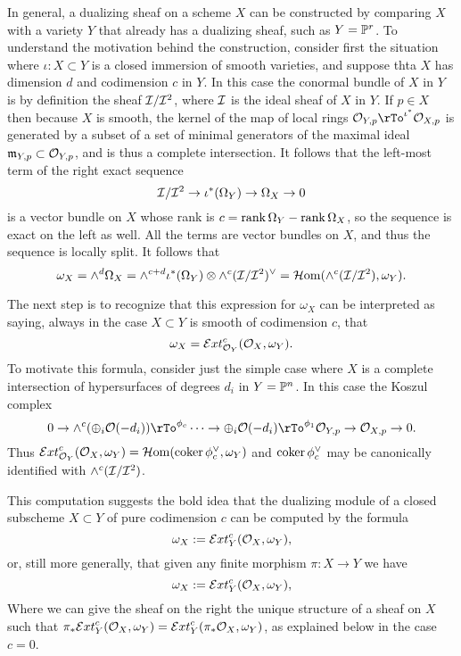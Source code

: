 In general, a dualizing sheaf on a scheme $X$ can be constructed by comparing $X$ with a 
variety $Y$ that already has a dualizing sheaf, such as $Y=\PP^{r}$. To understand the motivation behind the construction, 
consider first the situation where $\iota: X\subset Y$ is a closed immersion of smooth varieties, and suppose thta $X$ has dimension $d$ and codimension $c$ in $Y$.
In this case the conormal bundle of $X$ in $Y$ is by definition the sheaf
$\cI/\cI^{2}$, where $\cI$ is the ideal sheaf of $X$ in $Y$. If $p\in X$ then because $X$ is smooth, the kernel of the map of local rings $\cO_{Y,p} \rTo^{\iota^{*}} \cO_{X,p}$ is generated by a subset of a set of minimal generators of the maximal ideal $\gm_{Y,p}\subset \cO_{Y,p}$, and is thus a complete intersection. It follows that the left-most term of the right exact sequence
$$
\cI/\cI^{2} \to \iota^{*}(\Omega_{Y}) \to\Omega_{X} \to 0
$$
is a vector bundle on $X$ whose rank is  $c = \rank \Omega_{Y} -\rank \Omega_{X}$, so the sequence is exact on the left as well. All the terms are vector bundles on $X$, and thus the sequence
is locally split. It follows that 
$$
\omega_X = \wedge^{d}\Omega_{X} = \wedge^{c+d} \iota^{*}(\Omega_{Y})\otimes \wedge^{c}(\cI/\cI^{2})^{\vee} = \sHom(\wedge^{c}(\cI/\cI^{2}), \omega_{Y}).
$$ 

The next step is to recognize that this expression for $\omega_X$ can be interpreted as saying, always in the case $X\subset Y$ is smooth of
codimension $c$, that
$$
\omega_{X} = \sExt^{c}_{\cO_{Y}}(\cO_{X}, \omega_{Y}).
$$
To motivate this formula, consider just the simple case where $X$ is a complete intersection of hypersurfaces
of degrees $d_{i}$ in $Y = \PP^{n}$. In this case the Koszul complex
$$
0\to \wedge^{c} (\oplus_{i}\cO(-d_{i})) \rTo^{\phi_{c}} \cdots \to \oplus_{i}\cO(-d_{i}) \rTo^{\phi_{1}}\cO_{Y,p} \to\cO_{X,p} \to 0.
$$
Thus $\sExt^{c}_{\cO_{Y}}(\cO_{X}, \omega_{Y}) = \sHom(\coker \phi_{c}^{\vee}, \omega_{Y})$
and $\coker \phi_{c}^{\vee}$ may be canonically identified with $\wedge^{c}(\cI/\cI^{2})$.

This computation suggests the bold idea that the dualizing module of a closed subscheme
$X\subset Y$ of pure codimension $c$ can be computed by the formula
$$
\omega_{X} : = \sExt_{Y}^{c}(\cO_{X}, \omega_{Y}),
$$
or, still more generally, that given any finite morphism $\pi: X\to Y$ we have
$$
\omega_{X} : = \sExt_{Y}^{c}(\cO_{X}, \omega_{Y}),
$$
Where we can give the sheaf on the right the unique structure of a sheaf on $X$
such that $\pi_{*}\sExt_{Y}^{c}(\cO_{X}, \omega_{Y}) = \sExt_{Y}^{c}(\pi_{*}\cO_{X}, \omega_{Y})$, as explained below in the case $c=0$.


